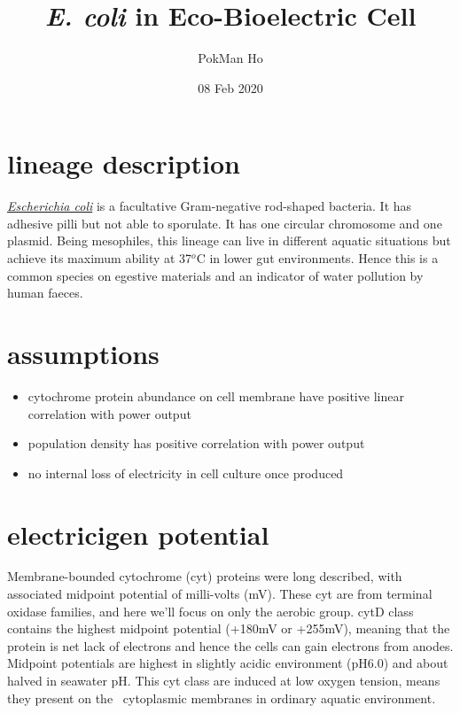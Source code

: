 \documentclass[a4paper,11pt]{article}
\title{\textit{E. coli} in Eco-Bioelectric Cell}
\author{PokMan Ho}
\date{08 Feb 2020}
\begin{document}
    \maketitle
    \tableofcontents

    \section{lineage description}
    \href{https://microbewiki.kenyon.edu/index.php/Escherichia_coli}{\textit{Escherichia coli}} is a facultative Gram-negative rod-shaped bacteria.  It has adhesive pilli but not able to sporulate.  It has one circular chromosome and one plasmid.  Being mesophiles, this lineage can live in different aquatic situations but achieve its maximum ability at 37$^o$C in lower gut environments.  Hence this is a common species on egestive materials and an indicator of water pollution by human faeces.
    
    \section{assumptions}
    \begin{itemize}
        \item cytochrome protein abundance on cell membrane have positive linear correlation with power output
        \item population density has positive correlation with power output
        \item no internal loss of electricity in cell culture once produced
    \end{itemize}
    
    \section{electricigen potential}
    Membrane-bounded cytochrome (cyt) proteins were long described\autocite{gennis1987cytochromes}, with associated midpoint potential of milli-volts (mV).  These cyt are from terminal oxidase families, and here we'll focus on only the aerobic group.  cytD class contains the highest midpoint potential (+180mV\autocite{gennis1987cytochromes} or +255mV\autocite{lorence1984effects}), meaning that the protein is net lack of electrons and hence the cells can gain electrons from anodes.  Midpoint potentials are highest in slightly acidic environment (pH6.0) and about halved in seawater pH\autocite{lorence1984effects}.  This cyt class are induced at low oxygen tension\autocite{gennis1987cytochromes}, means they present on the \ec\ cytoplasmic membranes in ordinary aquatic environment.
    
\end{document}
